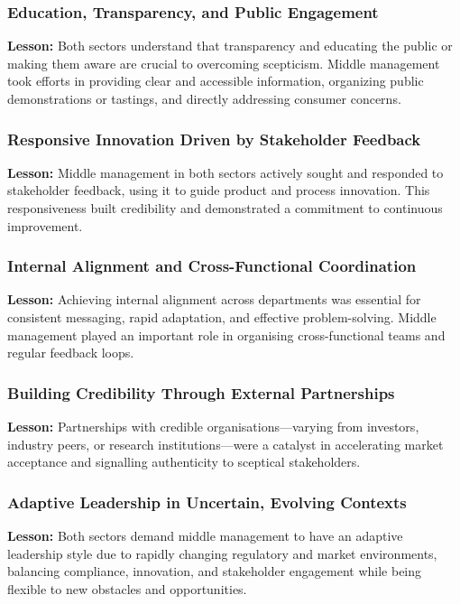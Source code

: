 \subsubsection{Education, Transparency, and Public Engagement}
\noindent\textbf{Lesson:} Both sectors understand that transparency and educating the public or making them aware are crucial to overcoming scepticism. Middle management took efforts in providing clear and accessible information, organizing public demonstrations or tastings, and directly addressing consumer concerns.

\subsubsection{Responsive Innovation Driven by Stakeholder Feedback}
\noindent\textbf{Lesson:} Middle management in both sectors actively sought and responded to stakeholder feedback, using it to guide product and process innovation. This responsiveness built credibility and demonstrated a commitment to continuous improvement.

\subsubsection{Internal Alignment and Cross-Functional Coordination}
\noindent\textbf{Lesson:} Achieving internal alignment across departments was essential for consistent messaging, rapid adaptation, and effective problem-solving. Middle management played an important role in organising cross-functional teams and regular feedback loops.

\subsubsection{Building Credibility Through External Partnerships}
\noindent\textbf{Lesson:} Partnerships with credible organisations—varying from investors, industry peers, or research institutions—were a catalyst in accelerating market acceptance and signalling authenticity to sceptical stakeholders.

\subsubsection{Adaptive Leadership in Uncertain, Evolving Contexts}
\noindent\textbf{Lesson:} Both sectors demand middle management to have an adaptive leadership style due to rapidly changing regulatory and market environments, balancing compliance, innovation, and stakeholder engagement while being flexible to new obstacles and opportunities.

